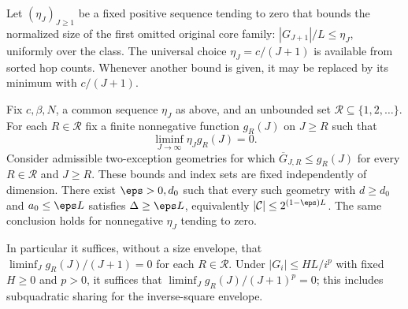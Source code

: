 Let $(\eta_J)_{J\ge1}$ be a fixed positive sequence tending to zero that
bounds the normalized size of the first omitted original core family:
$|G_{J+1}|/L\le\eta_J$, uniformly over the class. The universal choice
$\eta_J=c/(J+1)$ is available from sorted hop counts. Whenever another
bound is given, it may be replaced by its minimum with $c/(J+1)$.

\begin{theorem}\label{thm:uniform-sharing}
Fix $c,\beta,N$, a common sequence $\eta_J$ as above, and an unbounded
set $\mathcal R\subseteq\{1,2,\ldots\}$. For each $R\in\mathcal R$
fix a finite nonnegative function $g_R(J)$ on $J\ge R$ such that
\begin{equation}\label{eq:sharing-smallness}
 \liminf_{J\to\infty}\eta_Jg_R(J)=0.
\end{equation}
Consider admissible two-exception geometries for which
$\overline G_{J,R}\le g_R(J)$ for every $R\in\mathcal R$ and $J\ge R$.
These bounds and index sets are fixed independently of dimension.
There exist $\eps>0,d_0$ such that every such geometry with
$d\ge d_0$ and $a_0\le\eps L$ satisfies $\Delta\ge\eps L$, equivalently
$|\mathcal C|\le2^{(1-\eps)L}$.
The same conclusion holds for nonnegative $\eta_J$ tending to zero.

In particular it suffices, without a size envelope, that
$\liminf_J g_R(J)/(J+1)=0$ for each $R\in\mathcal R$.
Under $|G_i|\le HL/i^p$ with fixed $H\ge0$ and $p>0$, it suffices that
$\liminf_J g_R(J)/(J+1)^p=0$; this includes subquadratic sharing
for the inverse-square envelope.
\end{theorem}
